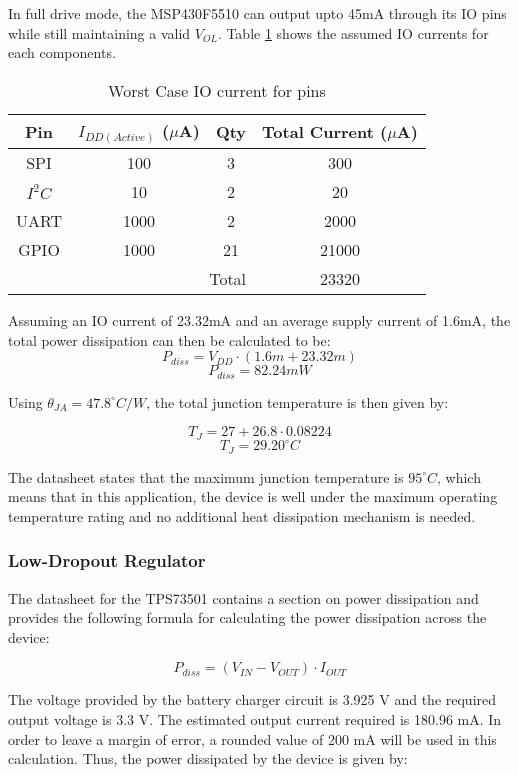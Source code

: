 In full drive mode, the MSP430F5510 can output upto 45mA through its IO pins while still maintaining a valid $V_{OL}$.    Table \ref{tab:ioCurrents} shows the assumed IO currents for each components.
\begin{table}[H]
  \centering
  \caption{Worst Case IO current for pins}
    \begin{tabular}{|c|c|c|c|}
     \hline
     \rowcolor{Gray}
    Pin & $I_{DD(Active)}$ ($\mu$A) & Qty & Total Current ($\mu$A)\\
     \hline \hline
    SPI & 100  & 3 & 300 \\ \hline
   	$I^2C$ & 10 & 2 & 20  \\ \hline
    UART & 1000 & 2 & 2000 \\ \hline
    GPIO  & 1000 & 21 & 21000\\ \hline \hline
    \multicolumn{3}{|r|}{Total} & 23320 \\ \hline 
    \end{tabular}%
  \label{tab:ioCurrents}%
\end{table}%
Assuming an IO current of 23.32mA and an average supply current of 1.6mA, the total power dissipation can then be calculated to be:
\[P_{diss} = V_{DD} \cdot \left(1.6m + 23.32m \right)\]
\[\boxed{P_{diss} = 82.24mW}\]

Using $\theta_{JA} = 47.8^\circ C/W$, the total junction temperature is then given by:

\[T_J = 27 + 26.8 \cdot 0.08224 \]
\[\boxed{T_J = 29.20 ^\circ C}\]

The datasheet states that the maximum junction temperature is $95^\circ C$, which means that in this application, the device is well under the maximum operating temperature rating and no additional heat dissipation mechanism is needed.


\subsubsection{Low-Dropout Regulator}
The datasheet for the TPS73501 contains a section on power dissipation and provides the following formula for calculating the power dissipation across the device:

\[P_{diss} = \left(V_{IN} - V_{OUT}\right)\cdot I_{OUT}\]

The voltage provided by the battery charger circuit is 3.925 V and the required output voltage is 3.3 V.  The estimated output current required is 180.96 mA.  In order to leave a margin of error, a rounded value of 200 mA will be used in this calculation.  Thus, the power dissipated by the device is given by:

